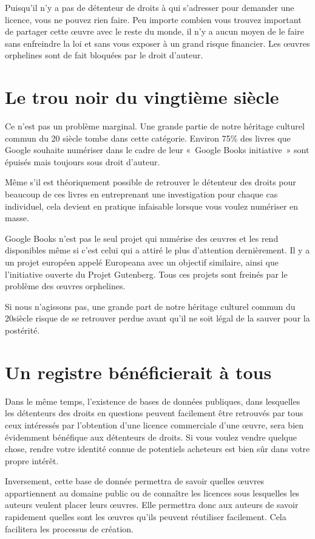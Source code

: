 Puisqu’il n’y a pas de détenteur de droits à qui s’adresser pour demander une licence, vous ne
pouvez rien faire. Peu importe combien vous trouvez important de partager cette œuvre avec le reste
du monde, il n’y a aucun moyen de le faire sans enfreindre la loi et sans vous exposer à un grand
risque financier. Les œuvres orphelines sont de fait bloquées par le droit d’auteur.

\section{Le trou noir du vingtième siècle}

Ce n’est pas un problème marginal. Une grande partie de notre héritage culturel commun du 20\ieme
siècle tombe dans cette catégorie. Environ 75\% des livres que Google souhaite numériser dans le
cadre de leur «~Google Books initiative~» sont épuisés mais toujours sous droit d’auteur.

Même s’il est théoriquement possible de retrouver le détenteur des droits pour beaucoup de ces
livres en entreprenant une investigation pour chaque cas individuel, cela devient en pratique
infaisable lorsque vous voulez numériser en masse.

Google Books n’est pas le seul projet qui numérise des œuvres et les rend disponibles même si
c’est celui qui a attiré le plus d’attention dernièrement. Il y a un projet européen appelé
Europeana avec un objectif similaire, ainsi que
l’initiative ouverte du Projet Gutenberg.
Tous ces
projets sont freinés par le problème des œuvres orphelines.

Si nous n’agissons pas, une grande part de notre héritage culturel commun du 20\ieme siècle risque de
se retrouver perdue avant qu’il ne soit légal de la sauver pour la postérité.

\section{Un registre bénéficierait à tous}

Dans le même temps, l’existence de bases de données publiques, dans lesquelles les détenteurs des
droits en questions peuvent facilement être retrouvés par tous ceux intéressés par l’obtention d’une
licence commerciale d’une œuvre, sera bien évidemment bénéfique aux détenteurs de droits. Si vous
voulez vendre quelque chose, rendre votre identité connue de potentiels acheteurs est bien sûr dans
votre propre intérêt.

Inversement, cette base de donnée permettra de savoir quelles œuvres appartiennent au domaine public ou de connaître les licences sous lesquelles les auteurs veulent placer leurs œuvres. Elle permettra donc aux auteurs de savoir rapidement quelles sont les œuvres qu'ils peuvent réutiliser facilement. Cela facilitera les processus de création.

